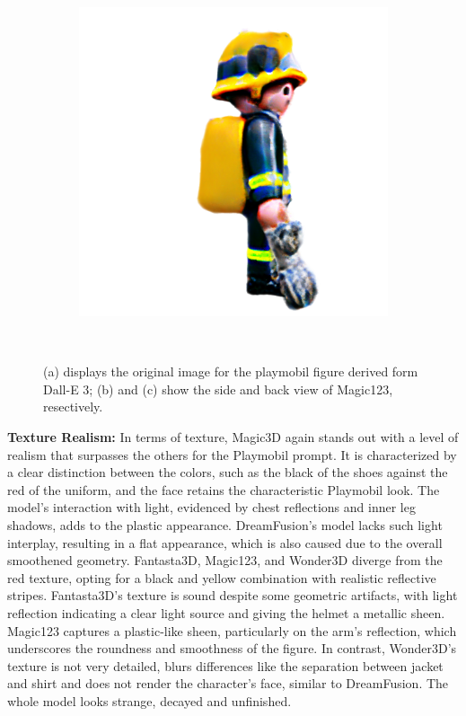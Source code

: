 \begin{figure}[ht]
\begin{subfigure}[b]{0.25\textwidth}
        \caption{}
    \end{subfigure}
    \begin{subfigure}[b]{0.25\textwidth}
        \centering
        \includegraphics[width=\textwidth]{etc/a high quality rendering of a playmobil firefighter/magic123/magic123_playmobil_coarse_right_10000_part1.png}
        \caption{}
    \end{subfigure}
    \caption{(a) displays the original image for the playmobil figure derived form Dall-E 3; (b) and (c) show the side and back view of Magic123, resectively.}~\label{fig:inputPlaymobil}
\end{figure}

\textbf{Texture Realism:} In terms of texture, Magic3D again stands out with a level of realism that surpasses the others for the Playmobil prompt. It is characterized by a clear distinction between the colors, such as the black of the shoes against the red of the uniform, and the face retains the characteristic Playmobil look. The model's interaction with light, evidenced by chest reflections and inner leg shadows, adds to the plastic appearance. DreamFusion's model lacks such light interplay, resulting in a flat appearance, which is also caused due to the overall smoothened geometry. Fantasta3D, Magic123, and Wonder3D diverge from the red texture, opting for a black and yellow combination with realistic reflective stripes. Fantasta3D's texture is sound despite some geometric artifacts, with light reflection indicating a clear light source and giving the helmet a metallic sheen. Magic123 captures a plastic-like sheen, particularly on the arm's reflection, which underscores the roundness and smoothness of the figure. In contrast, Wonder3D's texture is not very detailed, blurs differences like the separation between jacket and shirt and does not render the character's face, similar to DreamFusion. The whole model looks strange, decayed and unfinished.

